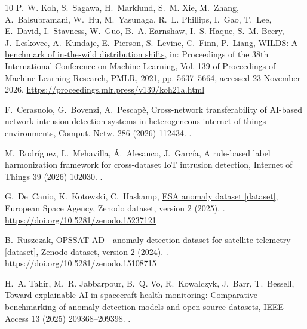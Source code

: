 \documentclass[preprint,12pt]{elsarticle}
\begin{document}
\begin{thebibliography}{10}
P.~W. Koh, S.~Sagawa, H.~Marklund, S.~M. Xie, M.~Zhang, A.~Balsubramani, W.~Hu,
  M.~Yasunaga, R.~L. Phillips, I.~Gao, T.~Lee, E.~David, I.~Stavness, W.~Guo,
  B.~A. Earnshaw, I.~S. Haque, S.~M. Beery, J.~Leskovec, A.~Kundaje,
  E.~Pierson, S.~Levine, C.~Finn, P.~Liang,
  \href{https://proceedings.mlr.press/v139/koh21a.html}{{WILDS}: A benchmark of
  in-the-wild distribution shifts}, in: Proceedings of the 38th International
  Conference on Machine Learning, Vol. 139 of Proceedings of Machine Learning
  Research, PMLR, 2021, pp. 5637--5664, accessed 23 November 2026.
\newline\urlprefix\url{https://proceedings.mlr.press/v139/koh21a.html}

F.~Cerasuolo, G.~Bovenzi, A.~Pescap{\`e}, Cross-network transferability of
  {AI}-based network intrusion detection systems in heterogeneous internet of
  things environments, Comput. Netw. 286 (2026) 112434.
\newblock \href {https://doi.org/10.1016/j.comnet.2026.112434}
  {}.

M.~Rodr{\'i}guez, L.~Mehavilla, {\'A}.~Alesanco, J.~Garc{\'i}a, A rule-based
  label harmonization framework for cross-dataset {IoT} intrusion detection,
  Internet of Things 39 (2026) 102030.
\newblock \href {https://doi.org/10.1016/j.iot.2026.102030}
  {}.

G.~De~Canio, K.~Kotowski, C.~Haskamp,
  \href{https://doi.org/10.5281/zenodo.15237121}{{ESA} anomaly dataset
  {[dataset]}}, European Space Agency, Zenodo dataset, version 2 (2025).
\newblock \href {https://doi.org/10.5281/zenodo.15237121}
  {}.
\newline\urlprefix\url{https://doi.org/10.5281/zenodo.15237121}

B.~Ruszczak, \href{https://doi.org/10.5281/zenodo.15108715}{{OPSSAT-AD} -
  anomaly detection dataset for satellite telemetry {[dataset]}}, Zenodo
  dataset, version 2 (2024).
\newblock \href {https://doi.org/10.5281/zenodo.15108715}
  {}.
\newline\urlprefix\url{https://doi.org/10.5281/zenodo.15108715}

H.~A. Tahir, M.~R. Jabbarpour, B.~Q. Vo, R.~Kowalczyk, J.~Barr, T.~Bessell,
  Toward explainable {AI} in spacecraft health monitoring: Comparative
  benchmarking of anomaly detection models and open-source datasets, IEEE
  Access 13 (2025) 209368--209398.
\newblock \href {https://doi.org/10.1109/ACCESS.2025.3639551}
  {}.


\end{thebibliography}
\end{document}
